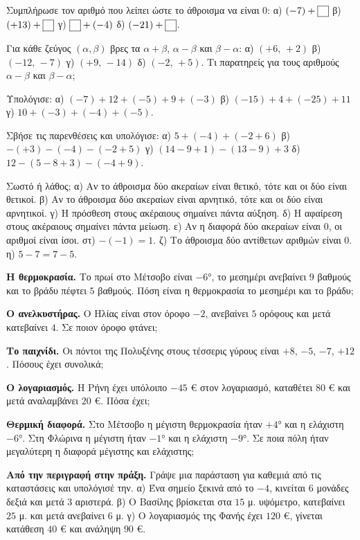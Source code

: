 \ex Συμπλήρωσε τον αριθμό που λείπει ώστε το άθροισμα να είναι $0$: α) $(-7)+\kouti$ \quad β) $(+13)+\kouti$ \quad γ) $\kouti+(-4)$ \quad δ) $(-21)+\kouti$.

\ex Για κάθε ζεύγος $(\alpha,\beta)$ βρες τα $\alpha+\beta$, $\alpha-\beta$ και $\beta-\alpha$: α) $(+6,\,+2)$ \quad β) $(-12,\,-7)$ \quad γ) $(+9,\,-14)$ \quad δ) $(-2,\,+5)$. Τι παρατηρείς για τους αριθμούς $\alpha-\beta$ και $\beta-\alpha$;

\ex Υπολόγισε: α) $(-7)+12+(-5)+9+(-3)$ \quad β) $(-15)+4+(-25)+11$ \quad γ) $10+(-3)+(-4)+(-5)$.

\ex Σβήσε τις παρενθέσεις και υπολόγισε: α) $5+(-4)+(-2+6)$ \quad β) $-(+3)-(-4)-(-2+5)$ \quad γ) $(14-9+1)-(13-9)+3$ \quad δ) $12-(5-8+3)-(-4+9)$.

\ex Σωστό ή λάθος; α) Αν το άθροισμα δύο ακεραίων είναι θετικό, τότε και οι δύο είναι θετικοί. \quad β) Αν το άθροισμα δύο ακεραίων είναι αρνητικό, τότε και οι δύο είναι αρνητικοί. \quad γ) Η πρόσθεση στους ακέραιους σημαίνει πάντα αύξηση. \quad δ) Η αφαίρεση στους ακέραιους σημαίνει πάντα μείωση. \quad ε) Αν η διαφορά δύο ακεραίων είναι $0$, οι αριθμοί είναι ίσοι. \quad στ) $-(-1)=1$. \quad ζ) Το άθροισμα δύο αντίθετων αριθμών είναι $0$. \quad η) $5-7=7-5$.


\ex \textbf{Η θερμοκρασία.} Το πρωί στο Μέτσοβο είναι $-6$°, το μεσημέρι ανεβαίνει $9$ βαθμούς και το βράδυ πέφτει $5$ βαθμούς. Πόση είναι η θερμοκρασία το μεσημέρι και το βράδυ;

\ex \textbf{Ο ανελκυστήρας.} Ο Ηλίας είναι στον όροφο $-2$, ανεβαίνει $5$ ορόφους και μετά κατεβαίνει $4$. Σε ποιον όροφο φτάνει;

\ex \textbf{Το παιχνίδι.} Οι πόντοι της Πολυξένης στους τέσσερις γύρους είναι $+8$, $-5$, $-7$, $+12$. Πόσους έχει συνολικά;

\ex \textbf{Ο λογαριασμός.} Η Ρήνη έχει υπόλοιπο $-45$ € στον λογαριασμό, καταθέτει $80$ € και μετά αναλαμβάνει $20$ €. Πόσα έχει;

\ex \textbf{Θερμική διαφορά.} Στο Μέτσοβο η μέγιστη θερμοκρασία ήταν $+4$° και η ελάχιστη $-6$°. Στη Φλώρινα η μέγιστη ήταν $-1$° και η ελάχιστη $-9$°. Σε ποια πόλη ήταν μεγαλύτερη η διαφορά μέγιστης και ελάχιστης;

\ex \textbf{Από την περιγραφή στην πράξη.} Γράψε μια παράσταση για καθεμιά από τις καταστάσεις και υπολόγισέ την. α) Ένα σημείο ξεκινά από το $-4$, κινείται $6$ μονάδες δεξιά και μετά $3$ αριστερά. β) Ο Βασίλης βρίσκεται στα $15$ μ. υψόμετρο, κατεβαίνει $25$ μ. και μετά ανεβαίνει $6$ μ. γ) Ο λογαριασμός της Φανής έχει $120$ €, γίνεται κατάθεση $40$ € και ανάληψη $90$ €.

